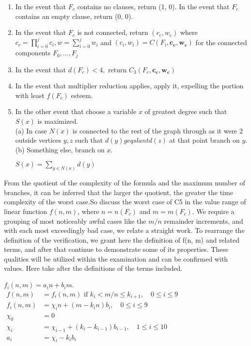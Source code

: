 \documentclass{sigchi}
\begin{document}
\begin{enumerate}
	\item In the event that $F_{c}$ contains no clauses, return (1, 0). In the event that $F_{c}$ contains an empty clause, return (0, 0).
	\item In the event that $F_{c}$ is not connected, return $(c_{c}, w_{c})$ where $c_{c}=\prod_{i=0}^{j} c_{i}, w=\sum_{i=0}^{j} w_{i}$ and $\left(c_{i}, w_{i}\right)=C\left(F_{i}, \mathbf{c_{c}}, \mathbf{w_{c}}\right)$ for the connected components $F_{0}, \ldots, F_{j}$
	\item In the event that $d(F_{c})<4,$ return $C_{3}(F_{c}, \mathbf{c_{c}}, \mathbf{w_{c}})$ 
	\item In the event that multiplier reduction applies, apply it, expelling the portion with least $f(F_{c})$ esteem.
	\item In the other event that choose a variable $x$ of greatest degree such that $S(x)$ is maximized.\\
	(a) In case $N(x)$ is connected to the rest of the graph through as it were 2 outside vertices $y, z$ such that $d(y) geqslant d(z)$ at that point branch on $y .$\\
	(b) Something else, branch on $x .$
	\begin{center}
		$S(x)=\sum_{y \in N(x)} d(y)$
	\end{center}
	
\end{enumerate}
From the quotient of the complexity of the formula and the maximum number of branches, it can be inferred that the larger the quotient, the greater the time complexity of the worst case.So discuss the worst case of C5 in the value range of linear function $f\left(n,m\right)$, where $n=n(F_{c})$ and $m=m(F_{c})$. 
We require a grouping of most noticeably awful cases like the $m / n$ remainder increments, and with each most exceedingly bad case, we relate a straight work. To rearrange the definition of the verification, we grant here the definition of f(n, m) and related terms, and after that continue to demonstrate some of its properties. These qualities will be utilized within the examination and can be confirmed with values. 
Here take after the deﬁnitions of the terms included.
\begin{center}
	$f_{i}(n, m)=a_{i} n+b_{i} m$. \\
	$\begin{aligned} f(n, m) &=f_{i}(n, m) \text { if } k_{i}<m / n \leqslant k_{i+1}, \quad 0 \leqslant i \leqslant 9 \\ f_{i}(n, m) &=\chi_{i} n+\left(m-k_{i} n\right) b_{i}, \quad 0 \leqslant i \leqslant 9 \\ \chi_{0} &=0 \\ \chi_{i} &=\chi_{i-1}+\left(k_{i}-k_{i-1}\right) b_{i-1}, \quad 1 \leqslant i \leqslant 10 \\ a_{i} &=\chi_{i}-k_{i} b_{i} \end{aligned}$\\
\end{center}
\end{document}
